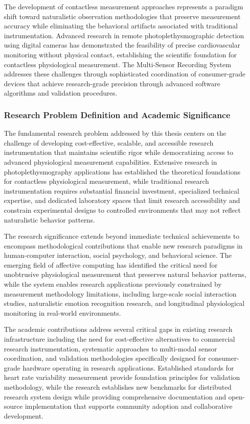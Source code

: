 \documentclass[12pt,a4paper]{article}
\begin{document}
The development of contactless measurement approaches represents a paradigm shift toward naturalistic observation
methodologies that preserve measurement accuracy while eliminating the behavioral artifacts associated with traditional
instrumentation. Advanced research in remote photoplethysmographic detection using digital cameras has demonstrated the
feasibility of precise cardiovascular monitoring without physical contact, establishing the scientific foundation for
contactless physiological measurement. The Multi-Sensor Recording System addresses these challenges through
sophisticated coordination of consumer-grade devices that achieve research-grade precision through advanced software
algorithms and validation procedures.

\subsubsection{Research Problem Definition and Academic Significance}

The fundamental research problem addressed by this thesis centers on the challenge of developing cost-effective,
scalable, and accessible research instrumentation that maintains scientific rigor while democratizing access to advanced
physiological measurement capabilities. Extensive research in photoplethysmography applications has established the
theoretical foundations for contactless physiological measurement, while traditional research instrumentation requires
substantial financial investment, specialized technical expertise, and dedicated laboratory spaces that limit research
accessibility and constrain experimental designs to controlled environments that may not reflect naturalistic behavior
patterns.

The research significance extends beyond immediate technical achievements to encompass methodological contributions that
enable new research paradigms in human-computer interaction, social psychology, and behavioral science. The emerging
field of affective computing has identified the critical need for unobtrusive physiological measurement that preserves
natural behavior patterns, while the system enables research applications previously constrained by measurement
methodology limitations, including large-scale social interaction studies, naturalistic emotion recognition research,
and longitudinal physiological monitoring in real-world environments.

The academic contributions address several critical gaps in existing research infrastructure including the need for
cost-effective alternatives to commercial research instrumentation, systematic approaches to multi-modal sensor
coordination, and validation methodologies specifically designed for consumer-grade hardware operating in research
applications. Established standards for heart rate variability measurement provide foundation principles for validation
methodology, while the research establishes new benchmarks for distributed research system design while providing
comprehensive documentation and open-source implementation that supports community adoption and collaborative
development.
\end{document}
